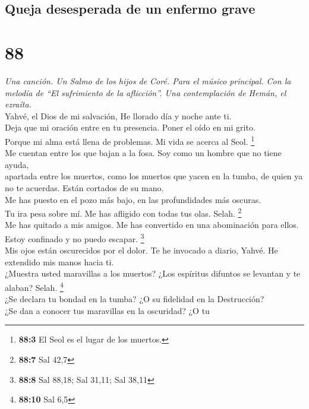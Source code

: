 \hypertarget{queja-desesperada-de-un-enfermo-grave}{%
\subsection{Queja desesperada de un enfermo
grave}\label{queja-desesperada-de-un-enfermo-grave}}

\hypertarget{section-85}{%
\section{88}\label{section-85}}

\emph{Una canción. Un Salmo de los hijos de Coré. Para el músico
principal. Con la melodía de ``El sufrimiento de la aflicción''. Una
contemplación de Hemán, el ezraíta.}\\
 Yahvé, el Dios de mi salvación, He llorado día y noche
ante ti.\\
 Deja que mi oración entre en tu presencia. Poner el oído
en mi grito.\\
 Porque mi alma está llena de problemas. Mi vida se acerca
al Seol. \footnote{\textbf{88:3} El Seol es el lugar de los muertos.}\\
 Me cuentan entre los que bajan a la fosa. Soy como un
hombre que no tiene ayuda,\\
 apartada entre los muertos, como los muertos que yacen en
la tumba, de quien ya no te acuerdas. Están cortados de su mano.\\
 Me has puesto en el pozo más bajo, en las profundidades
más oscuras.\\
 Tu ira pesa sobre mí. Me has afligido con todas tus olas.
Selah. \footnote{\textbf{88:7} Sal 42,7}\\
 Me has quitado a mis amigos. Me has convertido en una
abominación para ellos. Estoy confinado y no puedo escapar.
\footnote{\textbf{88:8} Sal 88,18; Sal 31,11; Sal 38,11}\\
 Mis ojos están oscurecidos por el dolor. Te he invocado a
diario, Yahvé. He extendido mis manos hacia ti.\\
 ¿Muestra usted maravillas a los muertos? ¿Los espíritus
difuntos se levantan y te alaban? Selah. \footnote{\textbf{88:10} Sal
  6,5}\\
 ¿Se declara tu bondad en la tumba? ¿O su fidelidad en la
Destrucción?\\
 ¿Se dan a conocer tus maravillas en la oscuridad? ¿O tu
